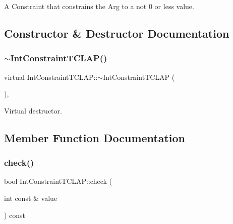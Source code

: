 A Constraint that constrains the Arg to a not 0 or less value. 

\subsection{Constructor \& Destructor Documentation}
\hypertarget{class_int_constraint_t_c_l_a_p_a5c6c58090c587d1904ab2483bba367e8}{}\label{class_int_constraint_t_c_l_a_p_a5c6c58090c587d1904ab2483bba367e8} 
\subsubsection{\texorpdfstring{$\sim$\+Int\+Constraint\+T\+C\+L\+A\+P()}{~IntConstraintTCLAP()}}
{\footnotesize\ttfamily virtual Int\+Constraint\+T\+C\+L\+A\+P\+::$\sim$\+Int\+Constraint\+T\+C\+L\+AP (\begin{DoxyParamCaption}{ }\end{DoxyParamCaption})\hspace{0.3cm}{\ttfamily [inline]}, {\ttfamily [virtual]}}

Virtual destructor. 

\subsection{Member Function Documentation}
\hypertarget{class_int_constraint_t_c_l_a_p_a30c4040229de8f3c7a20b2c9a7528af6}{}\label{class_int_constraint_t_c_l_a_p_a30c4040229de8f3c7a20b2c9a7528af6} 
\subsubsection{\texorpdfstring{check()}{check()}}
{\footnotesize\ttfamily bool Int\+Constraint\+T\+C\+L\+A\+P\+::check (\begin{DoxyParamCaption}\item[{int const \&}]{value }\end{DoxyParamCaption}) const\hspace{0.3cm}{\ttfamily [virtual]}}



